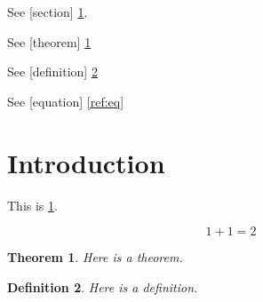 \documentclass{amsart}
\newtheorem{theorem}{Theorem}
\newtheorem{definition}[theorem]{Definition}
\begin{document}
See [section] \cref{sec:intro}.

See [theorem] \cref{thm:1}

See [definition] \cref{def:1}

See [equation] \cref{ref:eq}

\section{Introduction}
\label{sec:intro}

This is \cref{sec:intro}.

\begin{equation}
\label{ref:eq}
1 + 1 = 2
\end{equation}

\begin{theorem}\label{thm:1}
Here is a theorem.
\end{theorem}

\begin{definition}
\label{def:1}
Here is a definition.
\end{definition}
\end{document}
